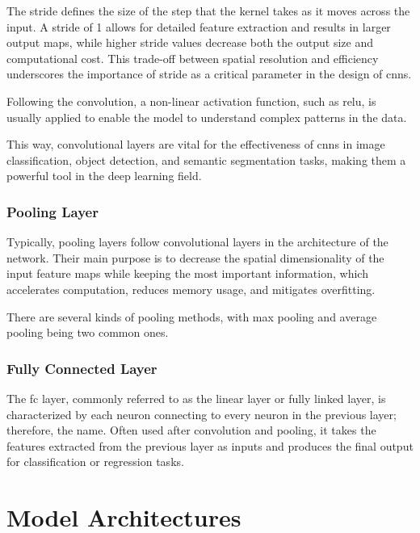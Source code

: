 The stride defines the size of the step that the kernel takes as it moves across the input. A stride of 1 allows for detailed feature extraction and results in larger output maps, while higher stride values decrease both the output size and computational cost. This trade-off between spatial resolution and efficiency underscores the importance of stride as a critical parameter in the design of \acp{cnn}.

Following the convolution, a non-linear activation function, such as \ac{relu}, is usually applied to enable the model to understand complex patterns in the data.

This way, convolutional layers are vital for the effectiveness of \acp{cnn} in image classification, object detection, and semantic segmentation tasks, making them a powerful tool in the deep learning field.


\subsubsection{Pooling Layer}

Typically, pooling layers follow convolutional layers in the architecture of the network.
Their main purpose is to decrease the spatial dimensionality of the input feature maps while keeping the most important information, which accelerates computation, reduces memory usage, and mitigates overfitting.

There are several kinds of pooling methods, with max pooling and average pooling being two common ones.

\subsubsection{Fully Connected Layer}
The \ac{fc} layer, commonly referred to as the linear layer or fully linked layer, is characterized by each neuron connecting to every neuron in the previous layer; therefore, the name.
Often used after convolution and pooling, it takes the features extracted from the previous layer as inputs and produces the final output for classification or regression tasks.


\section{Model Architectures}


